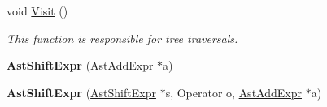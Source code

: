 \begin{DoxyCompactItemize}
\item 
void \hyperlink{classAstShiftExpr_ae20f0c9604ec1ca74911337e3ed375e5}{Visit} ()
\begin{DoxyCompactList}\small\item\em This function is responsible for tree traversals. \end{DoxyCompactList}\item 
\hypertarget{classAstShiftExpr_ae85c464914cce70d3ebb4f51b898781f}{{\bfseries Ast\-Shift\-Expr} (\hyperlink{classAstAddExpr}{Ast\-Add\-Expr} $\ast$a)}\label{classAstShiftExpr_ae85c464914cce70d3ebb4f51b898781f}

\item 
\hypertarget{classAstShiftExpr_a9c8c73a11d9e4da6264b1d83d4339cdb}{{\bfseries Ast\-Shift\-Expr} (\hyperlink{classAstShiftExpr}{Ast\-Shift\-Expr} $\ast$s, Operator o, \hyperlink{classAstAddExpr}{Ast\-Add\-Expr} $\ast$a)}\label{classAstShiftExpr_a9c8c73a11d9e4da6264b1d83d4339cdb}


\end{DoxyCompactItemize}
